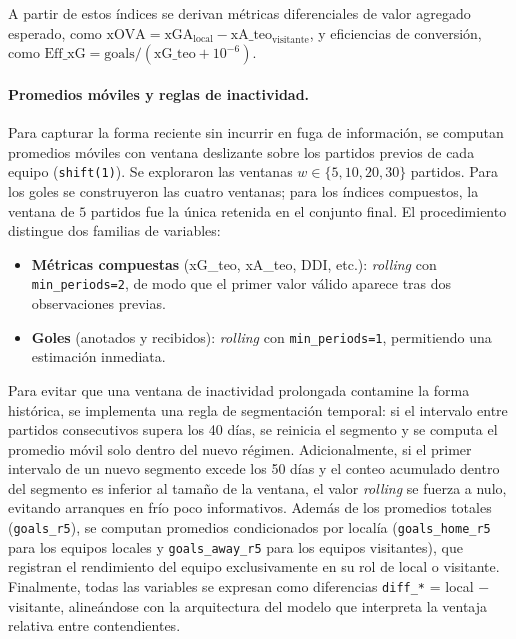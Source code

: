 A partir de estos \'indices se derivan m\'etricas diferenciales de valor agregado esperado, como $\text{xOVA} = \text{xGA}_{\text{local}} - \text{xA\_teo}_{\text{visitante}}$, y eficiencias de conversi\'on, como $\text{Eff\_xG} = \text{goals} / (\text{xG\_teo} + 10^{-6})$.

\paragraph{Promedios m\'oviles y reglas de inactividad.} Para capturar la forma reciente sin incurrir en fuga de informaci\'on, se computan promedios m\'oviles con ventana deslizante sobre los partidos previos de cada equipo (\texttt{shift(1)}). Se exploraron las ventanas $w \in \{5, 10, 20, 30\}$ partidos. Para los goles se construyeron las cuatro ventanas; para los \'indices compuestos, la ventana de $5$ partidos fue la \'unica retenida en el conjunto final. El procedimiento distingue dos familias de variables:
\begin{itemize}
	\item \textbf{M\'etricas compuestas} (xG\_teo, xA\_teo, DDI, etc.): \textit{rolling} con \texttt{min\_periods=2}, de modo que el primer valor v\'alido aparece tras dos observaciones previas.
	\item \textbf{Goles} (anotados y recibidos): \textit{rolling} con \texttt{min\_periods=1}, permitiendo una estimaci\'on inmediata.
\end{itemize}

Para evitar que una ventana de inactividad prolongada contamine la forma hist\'orica, se implementa una regla de segmentaci\'on temporal: si el intervalo entre partidos consecutivos supera los 40 d\'ias, se reinicia el segmento y se computa el promedio m\'ovil solo dentro del nuevo r\'egimen. Adicionalmente, si el primer intervalo de un nuevo segmento excede los 50 d\'ias y el conteo acumulado dentro del segmento es inferior al tama\~no de la ventana, el valor \textit{rolling} se fuerza a nulo, evitando arranques en fr\'io poco informativos. Adem\'as de los promedios totales (\texttt{goals\_r5}), se computan promedios condicionados por local\'ia (\texttt{goals\_home\_r5} para los equipos locales y \texttt{goals\_away\_r5} para los equipos visitantes), que registran el rendimiento del equipo exclusivamente en su rol de local o visitante. Finalmente, todas las variables se expresan como diferencias \texttt{diff\_*} = local $-$ visitante, aline\'andose con la arquitectura del modelo que interpreta la ventaja relativa entre contendientes.


